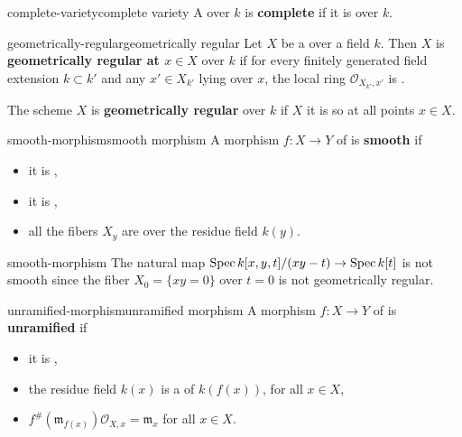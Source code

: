 \begin{topic}{complete-variety}{complete variety}
    A  over $k$ is \textbf{complete} if it is  over $k$.
\end{topic}

\begin{topic}{geometrically-regular}{geometrically regular}
    Let $X$ be a   over a field $k$. Then $X$ is \textbf{geometrically regular at $x \in X$} over $k$ if for every finitely generated field extension $k \subset k'$ and any $x' \in X_{k'}$ lying over $x$, the local ring $\mathcal{O}_{X_{k'}, x'}$ is .
    
    The scheme $X$ is \textbf{geometrically regular} over $k$ if $X$ it is so at all points $x \in X$.
\end{topic}

\begin{topic}{smooth-morphism}{smooth morphism}
    A morphism $f : X \to Y$ of  is \textbf{smooth} if
    \begin{itemize}
        \item it is ,
        \item it is ,
        \item all the fibers $X_y$ are  over the residue field $k(y)$.
    \end{itemize}
\end{topic}

\begin{example}{smooth-morphism}
    The natural map $\operatorname{Spec} k[x, y, t] / (xy - t) \to \operatorname{Spec} k[t]$ is not smooth since the fiber $X_0 = \{ xy = 0 \}$ over $t = 0$ is not geometrically regular.
\end{example}

\begin{topic}{unramified-morphism}{unramified morphism}
    A morphism $f : X \to Y$ of  is \textbf{unramified} if
    \begin{itemize}
        \item it is ,
        \item the residue field $k(x)$ is a  of $k(f(x))$, for all $x \in X$,
        \item $f^\#(\mathfrak{m}_{f(x)}) \mathcal{O}_{X, x} = \mathfrak{m}_x$ for all $x \in X$.
    \end{itemize}
\end{topic}

